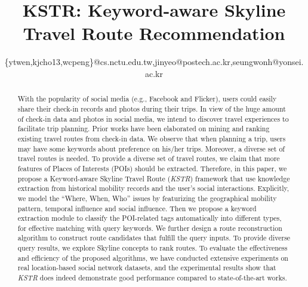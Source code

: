 \documentclass[10pt,conference,letterpaper]{IEEEtran}
\begin{document}
\title{KSTR: Keyword-aware Skyline Travel Route Recommendation}

\author{
{\{ytwen,kjcho13,wcpeng\}@cs.nctu.edu.tw,jinyeo@postech.ac.kr,seungwonh@yonsei.ac.kr}
}

\maketitle

\begin{abstract}
With the popularity of social media (e.g., Facebook and Flicker), users could easily share their check-in records and photos during their trips. In view of the huge amount of check-in data and photos in social media, we intend to discover travel experiences to facilitate trip planning. Prior works have been elaborated on mining and ranking existing travel routes from check-in data. We observe that when planning a trip, users may have some keywords about preference on his/her trips. Moreover, a diverse set of travel routes is needed. To provide a diverse set of travel routes, we claim that more features of Places of Interests (POIs) should be extracted. Therefore, in this paper, we propose a Keyword-aware Skyline Travel Route (\textit{KSTR}) framework that use knowledge extraction from historical mobility records and the user's social interactions. Explicitly, we model the ``Where, When, Who'' issues by featurizing the geographical mobility pattern, temporal influence and social influence. Then we propose a keyword extraction module to classify the POI-related tags automatically into different types, for effective matching with query keywords. We further design a route reconstruction algorithm to construct route candidates that fulfill the query inputs. To provide diverse query results, we explore Skyline concepts to rank routes. To evaluate the effectiveness and efficiency of the proposed algorithms, we have conducted extensive experiments on real location-based social network datasets, and the experimental results show that \textit{KSTR} does indeed demonstrate good performance compared to state-of-the-art works. 
\end{abstract}
\end{document}
